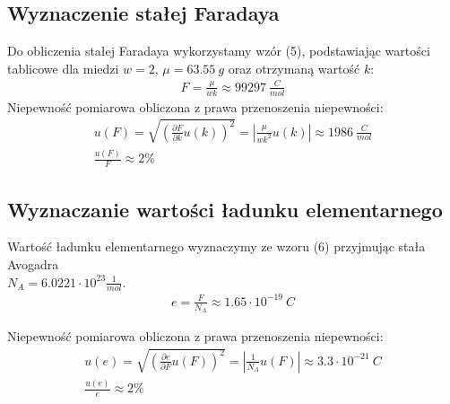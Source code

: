 \documentclass{fizykalab}
\begin{document}
{\subsection*{Wyznaczenie stałej Faradaya}
\par
Do obliczenia stałej Faradaya wykorzystamy wzór (5), podstawiając wartości tablicowe dla miedzi $w = 2$, $\mu = 63.55 \ g$ oraz otrzymaną wartość $k$:
\begin{gather*}
	F = \frac{\mu}{wk} \approx 99297 \ \frac{C}{mol}
\end{gather*}
Niepewność pomiarowa obliczona z prawa przenoszenia niepewności:
\begin{gather*}
	u(F) = \sqrt{\left(\frac{\partial F}{\partial k} u(k)\right)^2} = \left|\frac{\mu}{wk^2} u(k)\right| \approx 1986 \ \frac{C}{mol} \\
	\frac{u(F)}{F} \approx 2 \%
\end{gather*}

\subsection*{Wyznaczanie wartości ładunku elementarnego}
\par
Wartość ładunku elementarnego wyznaczymy ze wzoru (6) przyjmując stała Avogadra \\ $N_A = 6.0221 \cdot 10^{23} \frac{1}{mol}$.
\begin{gather*}
	e = \frac{F}{N_A} \approx 1.65 \cdot 10^{-19} \ C
\end{gather*}

Niepewność pomiarowa obliczona z prawa przenoszenia niepewności:
\begin{gather*}
	u(e) = \sqrt{\left(\frac{\partial e}{\partial F} u(F)\right)^2} = \left|\frac{1}{N_A} u(F)\right| \approx 3.3 \cdot 10^{-21} \ C \\
	\frac{u(e)}{e} \approx 2 \%
\end{gather*}

\newpage

}
\end{document}

